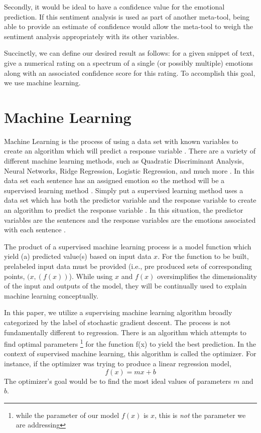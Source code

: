 \documentclass[titlepage,letterpaper]{article}
\begin{document}
Secondly, it would be ideal to have a confidence value for the emotional prediction. If this sentiment analysis is used as part of another meta-tool, being able to provide an estimate of confidence would allow the meta-tool to weigh the sentiment analysis appropriately with its other variables.

Succinctly, we can define our desired result as follows: for a given snippet of text, give a numerical rating on a spectrum of a single (or possibly multiple) emotions along with an associated confidence score for this rating. To accomplish this goal, we use machine learning. 

\section{Machine Learning}

Machine Learning is the process of using a data set with known variables to create an algorithm which will predict a response variable \cite{Statlearning}. There are a variety of different machine learning methods, such as Quadratic Discriminant Analysis, Neural Networks, Ridge Regression, Logistic Regression, and much more \cite{Statlearning}. In this data set each sentence has an assigned emotion so the method will be a supervised learning method \cite{Statlearning}. Simply put a supervised learning method uses a data set which has both the predictor variable and the response variable to create an algorithm to predict the response variable \cite{Statlearning}. In this situation, the predictor variables are the sentences and the response variables are the emotions associated with each sentence \cite{Statlearning}. 

    The product of a supervised machine learning process is a model function which yield (a) predicted value(s) based on input data $x$. For the function to be built, prelabeled input data must be provided (i.e., pre produced sets of corresponding points, $(x,(f(x))$). While using $x$ and $f(x)$ oversimplifies the dimensionality of the input and outputs of the model, they will be continually used to explain machine learning conceptually.

In this paper, we utilize a supervising machine learning algorithm broadly categorized by the label of stochastic gradient descent\cite{stoch}. The process is not fundamentally different to regression.  There is an algorithm which attempts to find optimal parameters\cite{regression} \footnote{while the parameter of our model $f(x)$ is $x$, this is \emph{not} the parameter we are addressing} for the function f(x) to yield the best prediction. In the context of supervised machine learning, this algorithm is called the optimizer. For instance, if the optimizer was trying to produce a linear regression model, 
\[f(x) = mx + b \]
The optimizer’s goal would be to find the most ideal values of parameters $m$ and $b$. 
\end{document}
